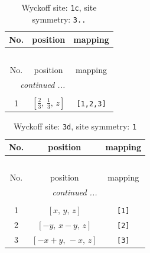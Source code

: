 \documentclass[fleqn,8pt]{jsarticle}
\begin{document}
\begin{longtable}{ccc}
\caption{Wyckoff site: {\tt 1c}, site symmetry: {\tt 3..}}
 \\
 \hline \hline
No. & position & mapping \\ \hline \endfirsthead

\multicolumn{2}{l}{\tablename\ \thetable{}} \\
 \hline \hline
No. & position & mapping \\ \hline \endhead

 \hline \hline
\multicolumn{2}{r}{\footnotesize\it continued ...} \\ \endfoot

 \hline \hline
\multicolumn{2}{r}{} \\ \endlastfoot

1 & $\left[ \frac{2}{3},\, \frac{1}{3},\, z \right]$ & {\tt [1,2,3]} \\
\end{longtable}
\renewcommand{\arraystretch}{1.2}
\begin{longtable}{ccc}
\caption{Wyckoff site: {\tt 3d}, site symmetry: {\tt 1}}
 \\
 \hline \hline
No. & position & mapping \\ \hline \endfirsthead

\multicolumn{2}{l}{\tablename\ \thetable{}} \\
 \hline \hline
No. & position & mapping \\ \hline \endhead

 \hline \hline
\multicolumn{2}{r}{\footnotesize\it continued ...} \\ \endfoot

 \hline \hline
\multicolumn{2}{r}{} \\ \endlastfoot

1 & $\left[ x,\, y,\, z \right]$ & {\tt [1]} \\ \hline
2 & $\left[ - y,\, x - y,\, z \right]$ & {\tt [2]} \\ \hline
3 & $\left[ - x + y,\, - x,\, z \right]$ & {\tt [3]} \\
\end{longtable}
\end{document}
